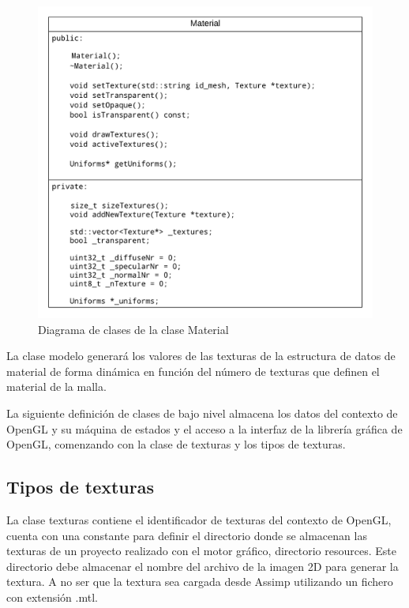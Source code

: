 \documentclass[a4paper, 17pt]{book}
\begin{document}
\begin{figure}[H]
    \centering
    \includegraphics[scale=0.5, keepaspectratio]{img/material_class.png}
    \caption{Diagrama de clases de la clase Material}
    \label{figura:material_class}
\end{figure}

La clase modelo generará los valores de las texturas de la estructura de datos de material de forma dinámica en función del número de
texturas que definen el material de la malla.

\vspace{1mm} %

La siguiente definición de clases de bajo nivel almacena los datos del contexto de OpenGL y su máquina de estados y el acceso a la
interfaz de la librería gráfica de OpenGL, comenzando con la clase de texturas y los tipos de texturas.

\subsection{Tipos de texturas}
\label{subsec:Texturas}

La clase texturas contiene el identificador de texturas del contexto de OpenGL, cuenta con una constante para definir el directorio
donde se almacenan las texturas de un proyecto realizado con el motor gráfico, directorio resources. Este directorio debe almacenar el
nombre del archivo de la imagen 2D para generar la textura. A no ser que la textura sea cargada desde Assimp utilizando un fichero
con extensión .mtl.
\end{document}
